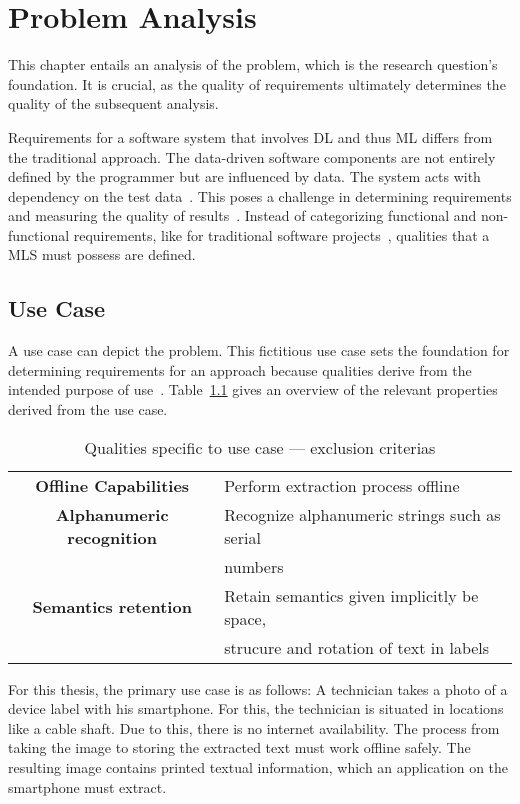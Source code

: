 \chapter{Problem Analysis}\label{ch:problem}
This chapter entails an analysis of the problem, which is the research question's foundation.
It is crucial, as the quality of requirements ultimately determines the quality of the
subsequent analysis.

Requirements for a software system that involves \ac{DL} and thus \ac{ML} differs from
the traditional approach. The data-driven software components are not entirely defined by the
programmer but are influenced by data.
The system acts with dependency on the test data~\citep{siebert_construction_2021}.
This poses a challenge in determining requirements and measuring the quality of
results~\citep{nakamichi_requirements-driven_2020}.
Instead of categorizing functional and non-functional requirements, like for traditional
software projects~\citep{zowghi_requirements_2014}, qualities that a \ac{MLS} must possess
are defined.

\section{Use Case}
A use case can depict the problem.
This fictitious use case sets the foundation for determining requirements for an
approach because qualities derive from the intended purpose of
use~\citep{siebert_construction_2021}.
Table~\ref{tb:useCaseQualities} gives an overview of the relevant properties derived
from the use case.
\begin{table}[ht]
    \centering\scriptsize
    \begin{tabular}{c l}
        \textbf{Offline Capabilities} & Perform extraction process offline \\
        \textbf{Alphanumeric recognition}    & Recognize alphanumeric strings such as serial \\
                                    & numbers \\
        \textbf{Semantics retention} & Retain semantics given implicitly be space, \\
                            & strucure and rotation of text in labels \\
    \end{tabular}
    \caption{Qualities specific to use case --- exclusion criterias\label{tb:useCaseQualities}}
\end{table}
For this thesis, the primary use case is as follows:
A technician takes a photo of a device label with his smartphone.
For this, the technician is situated in locations like a cable shaft.
Due to this, there is no internet availability.
The process from taking the image to storing the extracted text must work offline safely.
The resulting image contains printed textual information, which an application on the smartphone must
extract.


